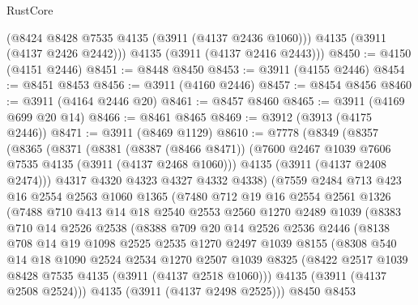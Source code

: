 \begin{lexlean}{RustCore}
\begin{coremodule}
        (@8424 @8428 @7535 @4135 (@3911 (@4137 @2436 @1060)))
        @4135
        (@3911 (@4137 @2426 @2442)))
      @4135
      (@3911 (@4137 @2416 @2443)))
@8450 := @4150 (@4151 @2446)
@8451 := @8448 @8450
@8453 := @3911 (@4155 @2446)
@8454 := @8451 @8453
@8456 := @3911 (@4160 @2446)
@8457 := @8454 @8456
@8460 := @3911 (@4164 @2446 @20)
@8461 := @8457 @8460
@8465 := @3911 (@4169 @699 @20 @14)
@8466 := @8461 @8465
@8469 := @3912 (@3913 (@4175 @2446))
@8471 := @3911 (@8469 @1129)
@8610 := @7778
    (@8349
      (@8357
        (@8365
          (@8371
            (@8381
              (@8387 (@8466 @8471))
              (@7600 @2467 @1039 @7606 @7535 @4135 (@3911 (@4137 @2468 @1060)))
              @4135
              (@3911 (@4137 @2408 @2474)))
            @4317
            @4320
            @4323
            @4327
            @4332
            @4338)
          (@7559
            @2484
            @713
            @423
            @16
            @2554
            @2563
            @1060
            @1365
            (@7480
              @712
              @19
              @16
              @2554
              @2561
              @1326
              (@7488
                @710
                @413
                @14
                @18
                @2540
                @2553
                @2560
                @1270
                @2489
                @1039
                (@8383
                  @710
                  @14
                  @2526
                  @2538
                  (@8388
                    @709
                    @20
                    @14
                    @2526
                    @2536
                    @2446
                    (@8138
                      @708
                      @14
                      @19
                      @1098
                      @2525
                      @2535
                      @1270
                      @2497
                      @1039
                      @8155
                      (@8308
                        @540
                        @14
                        @18
                        @1090
                        @2524
                        @2534
                        @1270
                        @2507
                        @1039
                        @8325
                        (@8422 @2517 @1039 @8428 @7535 @4135 (@3911 (@4137 @2518 @1060)))
                        @4135
                        (@3911 (@4137 @2508 @2524)))
                      @4135
                      (@3911 (@4137 @2498 @2525)))
                    @8450
                    @8453

\end{coremodule}
\end{lexlean}
